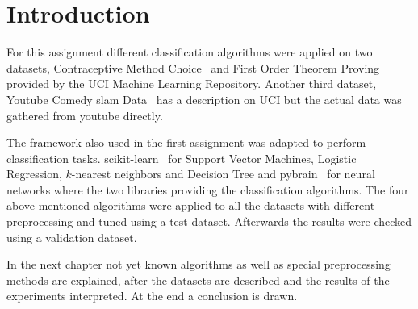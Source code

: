 \section{Introduction}
For this assignment different classification algorithms were applied on two datasets, Contraceptive Method Choice~\cite{ds1:uci} and First Order Theorem Proving~\cite{ds2:uci}~\cite{ds2:paper} provided by the UCI Machine Learning Repository. Another third dataset, Youtube Comedy slam Data~\cite{ds3:uci} has a description on UCI but the actual data was gathered from youtube directly.

\par The framework also used in the first assignment was adapted to perform classification tasks. scikit-learn~\cite{scikit} for Support Vector Machines, Logistic Regression, $k$-nearest neighbors and Decision Tree and pybrain~\cite{pybrain} for neural networks where the two libraries providing the classification algorithms.
The four above mentioned algorithms were applied to all the datasets with different preprocessing and tuned using a test dataset. Afterwards the results were checked using a validation dataset.
\par In the next chapter not yet known algorithms as well as special preprocessing methods are explained, after the datasets are described and the results of the experiments interpreted. At the end a conclusion is drawn.
